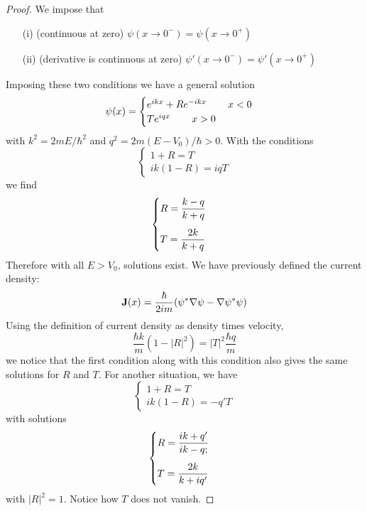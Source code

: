 \begin{proof}
We impose that 
\begin{itemize}
\item[(i)] (continuous at zero) $\psi (x\rightarrow 0^{-})=\psi (x\rightarrow 0^{+})$
\item[(ii)] (derivative is continuous at zero) $\psi '(x\rightarrow 0^{-})=\psi '(x\rightarrow 0^{+})$
\end{itemize}
Imposing these two conditions we have a general solution
\[\psi (x)=\begin{cases}
e^{ikx}+Re^{-ikx}\hspace{5ex}x<0\\
Te^{iqx}\hspace{5ex}x>0
\end{cases}\]
with $k^2=2mE/\hbar ^2$ and $q^2=2m(E-V_0)/\hbar >0$. With the conditions
\[\begin{cases}
1+R=T\\
ik(1-R)=iqT
\end{cases}\]
we find
\[\begin{cases}
\vspace{2ex}
R=\dfrac{k-q}{k+q}\\
T=\dfrac{2k}{k+q}
\end{cases}\]
Therefore with all $E>V_0$, solutions exist. We have previously defined the current density:
\[{\bf J}(x)=\dfrac{\hbar }{2im}(\psi ^{*}\nabla \psi -\nabla \psi ^{*}\psi )\]
Using the definition of current density as density times velocity,
\[\dfrac{\hbar k}{m}(1-|R|^2)=|T|^2\dfrac{\hbar q}{m}\]
we notice that the first condition along with this condition also gives the same solutions for $R$ and $T$. For another situation, we have 
\[\begin{cases}
1+R=T\\
ik(1-R)=-q'T
\end{cases}\]
with solutions
\[\begin{cases}
\vspace{2ex}
R=\dfrac{ik+q'}{ik-q;}\\
T=\dfrac{2k}{k+iq'}
\end{cases}\]
with $|R|^2=1$. Notice how $T$ does not vanish. 
\end{proof}
\vspace{2ex}


